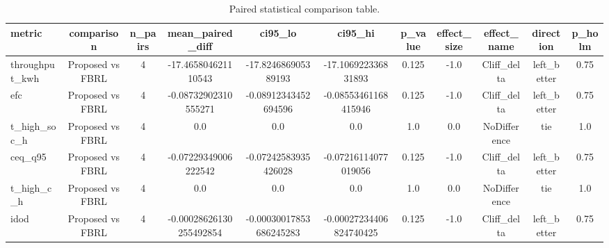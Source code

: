 \begin{table}[t]
\centering
\caption{Paired statistical comparison table.}
\label{tab:stats_auto}
\begin{tabular}{lcccccccccc}
\toprule
metric & comparison & n\_pairs & mean\_paired\_diff & ci95\_lo & ci95\_hi & p\_value & effect\_size & effect\_name & direction & p\_holm \\
\midrule
throughput\_kwh & Proposed vs FBRL & 4 & -17.465804621110543 & -17.824686905389193 & -17.106922336831893 & 0.125 & -1.0 & Cliff\_delta & left\_better & 0.75 \\
efc & Proposed vs FBRL & 4 & -0.08732902310555271 & -0.08912343452694596 & -0.08553461168415946 & 0.125 & -1.0 & Cliff\_delta & left\_better & 0.75 \\
t\_high\_soc\_h & Proposed vs FBRL & 4 & 0.0 & 0.0 & 0.0 & 1.0 & 0.0 & NoDifference & tie & 1.0 \\
ceq\_q95 & Proposed vs FBRL & 4 & -0.07229349006222542 & -0.07242583935426028 & -0.07216114077019056 & 0.125 & -1.0 & Cliff\_delta & left\_better & 0.75 \\
t\_high\_c\_h & Proposed vs FBRL & 4 & 0.0 & 0.0 & 0.0 & 1.0 & 0.0 & NoDifference & tie & 1.0 \\
idod & Proposed vs FBRL & 4 & -0.00028626130255492854 & -0.00030017853686245283 & -0.00027234406824740425 & 0.125 & -1.0 & Cliff\_delta & left\_better & 0.75 \\
\bottomrule
\end{tabular}
\end{table}